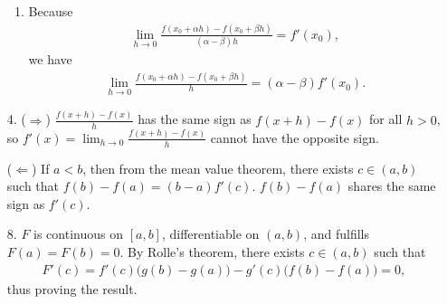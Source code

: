 \documentclass[a4paper,12pt]{article}
\begin{document}
\begin{enumerate}
\begin{enumerate}
                \item
                    Because
                    \begin{align*}
                        \lim_{h \to 0} \frac{f(x_0 + \alpha h) - f(x_0 + \beta h)}{(\alpha - \beta) h} = f'(x_0),
                    \end{align*}
                    we have
                    \begin{align*}
                        \lim_{h \to 0} \frac{f(x_0 + \alpha h) - f(x_0 + \beta h)}{h} = (\alpha - \beta) f'(x_0).
                    \end{align*}
            \end{enumerate}

        \item[4.]
            ($\Rightarrow$) $\frac{f(x + h) - f(x)}{h}$ has the same sign as $f(x + h) - f(x)$ for all $h > 0$, so $f'(x) = \lim_{h \to 0} \frac{f(x + h) - f(x)}{h}$ cannot have the opposite sign. \par
            ($\Leftarrow$) If $a < b$, then from the mean value theorem, there exists $c \in (a, b)$ such that $f(b) - f(a) = (b - a) f'(c)$. $f(b) - f(a)$ shares the same sign as $f'(c)$.

        \item[8.]
            $F$ is continuous on $[a, b]$, differentiable on $(a, b)$, and fulfills $F(a) = F(b) = 0$. By Rolle's theorem, there exists $c \in (a, b)$ such that
            \begin{align*}
                F'(c) = f'(c) \bigl( g(b) - g(a) \bigr) - g'(c) \bigl( f(b) - f(a) \bigr) = 0,
            \end{align*}
            thus proving the result.


\end{enumerate}
\end{document}
